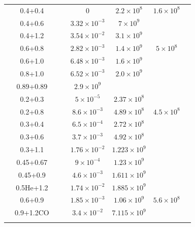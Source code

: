 \begin{table}
\begin{tabular}{cccccccc}
\hline
\citeauthor{guerig04}	& 0.4+0.4	& & & 0 & $2.2 \times 10^8$ & $1.6 \times 10^8$ & \\
	& 0.4+0.6	& & & $3.32 \times 10^{-3}$ & $7 \times 10^{9}$ & & \\
	& 0.4+1.2	& & & $3.54 \times 10^{-2}$ & $3.1 \times 10^9$ & & \\
	& 0.6+0.8	& & & $2.82 \times 10^{-3}$ & $1.4 \times 10^9$ & $5 \times 10^8$ & \\
	& 0.6+1.0	& & & $6.48 \times 10^{-3}$ & $1.6 \times 10^9$ & & \\
	& 0.8+1.0	& & & $6.52 \times 10^{-3}$ & $2.0 \times 10^9$ & & \\
\hline
\cite{pakm+10}	& 0.89+0.89	& & & $2.9 \times 10^9$ & & \\
\hline
\citeauthor{dan+11}	& 0.2+0.3	& & & $5 \times 10^{-5}$ & $2.37 \times 10^8$ & & \\
	& 0.2+0.8	& & & $8.6 \times 10^{-3}$ & $4.89 \times 10^8$ & $4.5 \times 10^8$ & \\
	& 0.3+0.4	& & & $6.5 \times 10^{-4}$ & $2.72 \times 10^{8}$ & & \\
	& 0.3+0.6	& & & $3.7 \times 10^{-3}$ & $4.92 \times 10^{8}$ & & \\
	& 0.3+1.1	& & & $1.76 \times 10^{-2}$ & $1.223 \times 10^{9}$ & & \\
	& 0.45+0.67	& & & $9 \times 10^{-4}$ & $1.23 \times 10^{9}$ & & \\
	& 0.45+0.9	& & & $4.6 \times 10^{-3}$ & $1.611 \times 10^{9}$ & & \\
	& 0.5He+1.2	& & & $1.74 \times 10^{-2}$ & $1.885 \times 10^{9}$ & & \\
	& 0.6+0.9	& & & $1.85 \times 10^{-3}$ & $1.06 \times 10^{9}$ & $5.6 \times 10^8$ & \\
	& 0.9+1.2CO	& & & $3.4 \times 10^{-2}$ & $7.115 \times 10^{9}$ & & \\
\hline & \\[-1em]\hline
\end{tabular}
\label{simtable}
\end{table}


